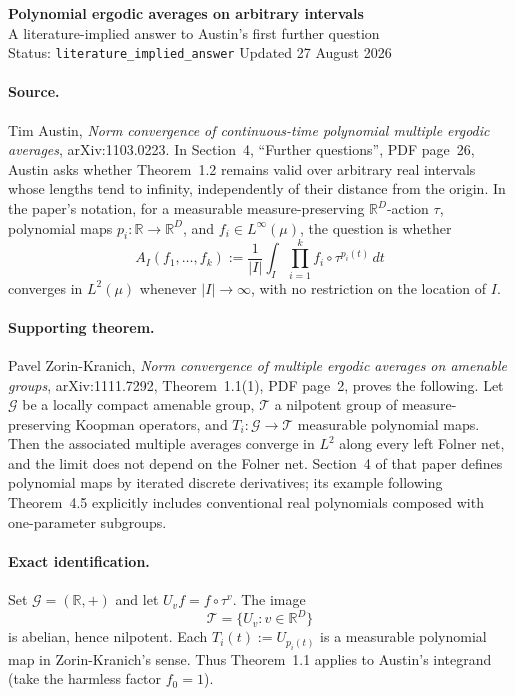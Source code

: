 \documentclass[11pt]{article}
\begin{document}
\begin{center}
  {\Large\bfseries\color{accent} Polynomial ergodic averages on arbitrary intervals}\\[4pt]
  {\large A literature-implied answer to Austin's first further question}\\[6pt]
  {\small Status: \texttt{literature\_implied\_answer} \quad Updated 27 August 2026}
\end{center}

\paragraph{Source.}
Tim Austin, \emph{Norm convergence of continuous-time polynomial multiple
ergodic averages}, arXiv:1103.0223.  In Section~4, ``Further questions'',
PDF page~26, Austin asks whether Theorem~1.2 remains valid over arbitrary real
intervals whose lengths tend to infinity, independently of their distance from
the origin.  In the paper's notation, for a measurable measure-preserving
$\mathbb R^D$-action $\tau$, polynomial maps $p_i:\mathbb R\to\mathbb R^D$,
and $f_i\in L^\infty(\mu)$, the question is whether
\[
  A_I(f_1,\ldots,f_k)
  :=\frac{1}{|I|}\int_I \prod_{i=1}^k f_i\circ\tau^{p_i(t)}\,dt
\]
converges in $L^2(\mu)$ whenever $|I|\to\infty$, with no restriction on the
location of $I$.

\paragraph{Supporting theorem.}
Pavel Zorin-Kranich, \emph{Norm convergence of multiple ergodic averages on
amenable groups}, arXiv:1111.7292, Theorem~1.1(1), PDF page~2, proves the
following.  Let $\mathcal G$ be a locally compact amenable group,
$\mathcal T$ a nilpotent group of measure-preserving Koopman operators, and
$T_i:\mathcal G\to\mathcal T$ measurable polynomial maps.  Then the associated
multiple averages converge in $L^2$ along every left Folner net, and the limit
does not depend on the Folner net.  Section~4 of that paper defines polynomial
maps by iterated discrete derivatives; its example following Theorem~4.5
explicitly includes conventional real polynomials composed with one-parameter
subgroups.

\paragraph{Exact identification.}
Set $\mathcal G=(\mathbb R,+)$ and let $U_v f=f\circ\tau^v$.  The image
\[
  \mathcal T=\{U_v:v\in\mathbb R^D\}
\]
is abelian, hence nilpotent.  Each $T_i(t):=U_{p_i(t)}$ is a measurable
polynomial map in Zorin-Kranich's sense.  Thus Theorem~1.1 applies to Austin's
integrand (take the harmless factor $f_0=1$).
\end{document}
